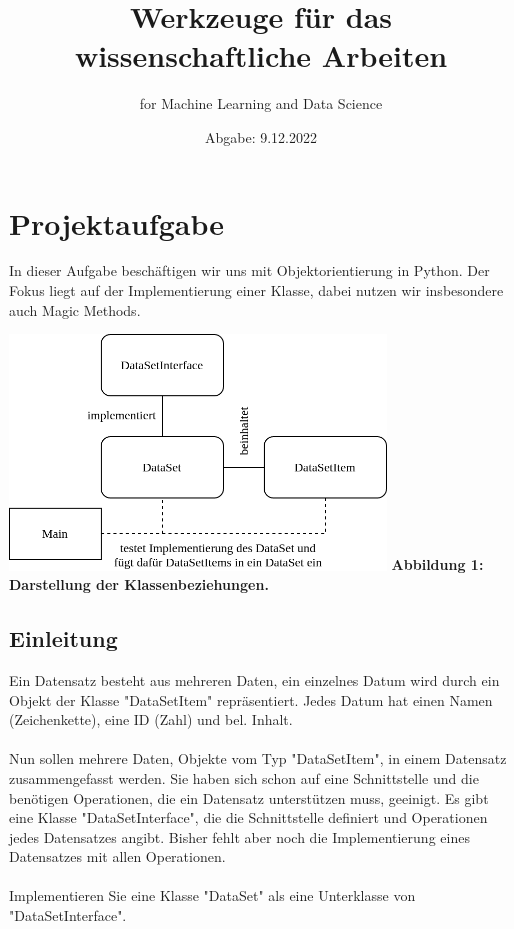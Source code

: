 \documentclass{article}
\begin{document}
	\title{Werkzeuge für das wissenschaftliche Arbeiten}
	\author{for Machine Learning and Data Science}
	\date{Abgabe: 9.12.2022}
	\maketitle
	
	\tableofcontents
	
	\section{Projektaufgabe}
		In dieser Aufgabe beschäftigen wir uns mit Objektorientierung in Python.
		Der Fokus liegt auf der Implementierung einer Klasse, dabei nutzen wir insbesondere auch Magic Methods.
		
		\hspace*{2cm}\includegraphics[width=10cm]{./../diagram/classes_files.png}
		\hspace*{3cm}\scriptsize\bf Abbildung 1: \normalfont Darstellung der Klassenbeziehungen.\normalsize

		\subsection{Einleitung}
			Ein Datensatz besteht aus mehreren Daten, ein einzelnes Datum wird durch ein Objekt der Klasse "DataSetItem" repräsentiert.
			Jedes Datum hat einen Namen (Zeichenkette), eine ID (Zahl) und bel. Inhalt.\\
			\\
			Nun sollen mehrere Daten, Objekte vom Typ "DataSetItem", in einem Datensatz zusammengefasst werden.
			Sie haben sich schon auf eine Schnittstelle und die benötigen Operationen, die ein Datensatz unterstützen muss, geeinigt.
			Es gibt eine Klasse "DataSetInterface", die die Schnittstelle definiert und Operationen jedes Datensatzes angibt.
			Bisher fehlt aber noch die Implementierung eines Datensatzes mit allen Operationen.\\
			\\
			Implementieren Sie eine Klasse "DataSet" als eine Unterklasse von "DataSetInterface".\\
	
\end{document}
